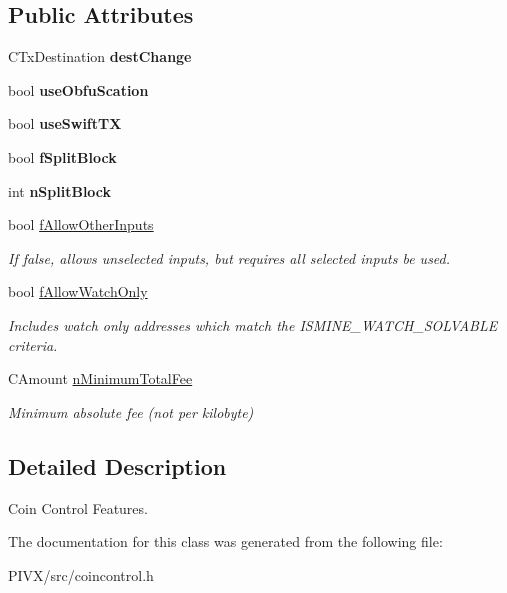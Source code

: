 \subsection*{Public Attributes}
\begin{DoxyCompactItemize}
\item 
\mbox{\label{class_c_coin_control_aa991ffd830267f6c2103fa7e03213f41}} 
C\+Tx\+Destination {\bfseries dest\+Change}
\item 
\mbox{\label{class_c_coin_control_a34c74f6fa2f58c1adb80602fd67c9e92}} 
bool {\bfseries use\+Obfu\+Scation}
\item 
\mbox{\label{class_c_coin_control_a4e1471ca5bf0dfc84b95e6fa7eeeb722}} 
bool {\bfseries use\+Swift\+TX}
\item 
\mbox{\label{class_c_coin_control_acad36178a2488dc978a39fbee43453f3}} 
bool {\bfseries f\+Split\+Block}
\item 
\mbox{\label{class_c_coin_control_ac75208bc1c4e0fad9de35997ee24d766}} 
int {\bfseries n\+Split\+Block}
\item 
\mbox{\label{class_c_coin_control_acd3e8686c8d78535153ed9fd734ef029}} 
bool \mbox{\hyperlink{class_c_coin_control_acd3e8686c8d78535153ed9fd734ef029}{f\+Allow\+Other\+Inputs}}
\begin{DoxyCompactList}\small\item\em If false, allows unselected inputs, but requires all selected inputs be used. \end{DoxyCompactList}\item 
\mbox{\label{class_c_coin_control_a83d3144efcfdd0e87467f0b2d98b4302}} 
bool \mbox{\hyperlink{class_c_coin_control_a83d3144efcfdd0e87467f0b2d98b4302}{f\+Allow\+Watch\+Only}}
\begin{DoxyCompactList}\small\item\em Includes watch only addresses which match the I\+S\+M\+I\+N\+E\+\_\+\+W\+A\+T\+C\+H\+\_\+\+S\+O\+L\+V\+A\+B\+LE criteria. \end{DoxyCompactList}\item 
\mbox{\label{class_c_coin_control_ae33d88969604e91eea3167f5626a5c82}} 
C\+Amount \mbox{\hyperlink{class_c_coin_control_ae33d88969604e91eea3167f5626a5c82}{n\+Minimum\+Total\+Fee}}
\begin{DoxyCompactList}\small\item\em Minimum absolute fee (not per kilobyte) \end{DoxyCompactList}\end{DoxyCompactItemize}


\subsection{Detailed Description}
Coin Control Features. 

The documentation for this class was generated from the following file\+:\begin{DoxyCompactItemize}
\item 
P\+I\+V\+X/src/coincontrol.\+h\end{DoxyCompactItemize}
